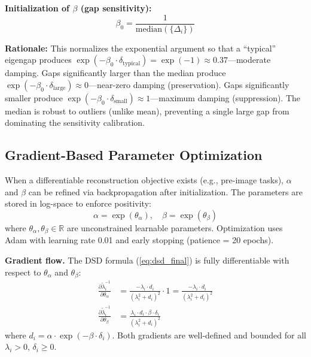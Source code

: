 \documentclass[preprint,review,12pt]{elsarticle}
\begin{document}
\textbf{Initialization of $\beta$ (gap sensitivity):}
\begin{equation}
\beta_0 = \frac{1}{\text{median}(\{\Delta_i\})}
\label{eq:beta_init}
\end{equation}

\textbf{Rationale:} This normalizes the exponential argument so that a ``typical'' eigengap produces $\exp(-\beta_0 \cdot \delta_{\text{typical}}) = \exp(-1) \approx 0.37$---moderate damping. Gaps significantly larger than the median produce $\exp(-\beta_0 \cdot \delta_{\text{large}}) \approx 0$---near-zero damping (preservation). Gaps significantly smaller produce $\exp(-\beta_0 \cdot \delta_{\text{small}}) \approx 1$---maximum damping (suppression). The median is robust to outliers (unlike mean), preventing a single large gap from dominating the sensitivity calibration.

\subsection{Gradient-Based Parameter Optimization}
\label{sec:gradient_optimization}

When a differentiable reconstruction objective exists (e.g., pre-image tasks), $\alpha$ and $\beta$ can be refined via backpropagation after initialization. The parameters are stored in log-space to enforce positivity:
\begin{equation}
\alpha = \exp(\theta_\alpha), \quad \beta = \exp(\theta_\beta)
\end{equation}
where $\theta_\alpha, \theta_\beta \in \mathbb{R}$ are unconstrained learnable parameters. Optimization uses Adam \cite{kingma2015adam} with learning rate 0.01 and early stopping (patience = 20 epochs).

\textbf{Gradient flow.} The DSD formula (\ref{eq:dsd_final}) is fully differentiable with respect to $\theta_\alpha$ and $\theta_\beta$:
\begin{align}
\frac{\partial \tilde{\lambda}_i^{-1}}{\partial \theta_\alpha} &= \frac{-\lambda_i \cdot d_i}{(\lambda_i^2 + d_i)^2} \cdot 1 = \frac{-\lambda_i \cdot d_i}{(\lambda_i^2 + d_i)^2} \label{eq:grad_alpha}\\
\frac{\partial \tilde{\lambda}_i^{-1}}{\partial \theta_\beta} &= \frac{\lambda_i \cdot d_i \cdot \beta \cdot \delta_i}{(\lambda_i^2 + d_i)^2} \label{eq:grad_beta}
\end{align}
where $d_i = \alpha \cdot \exp(-\beta \cdot \delta_i)$. Both gradients are well-defined and bounded for all $\lambda_i > 0$, $\delta_i \geq 0$.
\end{document}
